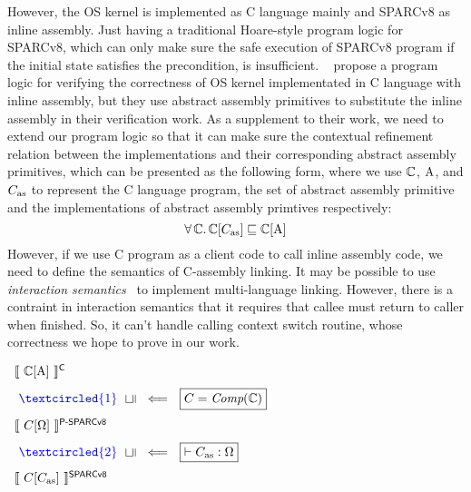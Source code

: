 However, the OS kernel is implemented as 
C language mainly and SPARCv8 as inline assembly. 
Just having a traditional Hoare-style 
program logic for SPARCv8, which can only make sure 
the safe execution of SPARCv8 program if the initial 
state satisfies the precondition, is insufficient.
~\cite{Xu16cav} propose a program logic for 
verifying the correctness of OS kernel implementated in 
C language with inline assembly, 
but they use abstract assembly primitives to 
substitute the inline assembly in their verification work.
As a supplement to their work, we need to extend our 
program logic so that it can make sure the  
contextual refinement relation between the implementations
and their corresponding abstract assembly primitives, 
which can be presented as the following form, where 
we use $\mathbb{C}$, $\text{A}$, and $C_{\text{as}}$ to represent 
the C language program, the set of abstract assembly 
primitive and the implementations of 
abstract assembly primtives respectively: 
\[
    \forall \, \mathbb{C}. \, 
    \mathbb{C}[C_{\text{as}}] \sqsubseteq \mathbb{C}[\text{A}]
\]
However, if we use C program as a client code to 
call inline assembly code, we need to define the 
semantics of C-assembly linking. 
It may be possible to use
\textit{interaction semantics}~\cite{Stewart15popl}
to implement multi-language linking. However, 
there is a contraint in interaction semantics that 
it requires that callee must return to caller when 
finished. So, it can't handle calling context switch 
routine, whose correctness we hope to prove in our work. 
\begin{center}
    $
        \begin{array}{l}
            \semantics{\Clang[\AbsPrimC]}^{\textsf{C}}
            \\
            \\[-5pt]
            \ 
            {\color{blue} \textcircled{1}} \ \ 
            \rotatebox[origin=c]{90}{$\refine$} \ \  
            \Longleftarrow \ \ 
            \boxed{C = \textit{Comp}(\Clang)}
            \\
            \\[-5pt]
            \semantics{\code[\hprimset]}^{\textsf{P-SPARCv8}}
            \\
            \\[-5pt]
            \  
            {\color{blue} \textcircled{2}} \ \ 
            \rotatebox[origin=c]{90}{$\refine$} \ \ 
            \Longleftarrow \ \ 
            \boxed{\vdash\asmimp:\hprimset}
            \\
            \\[-5pt]
            \semantics{\code[\asmimp]}^{\textsf{SPARCv8}}
        \end{array}
    $
    \label{fig:idea to establish contextual refinement}
\end{center}
